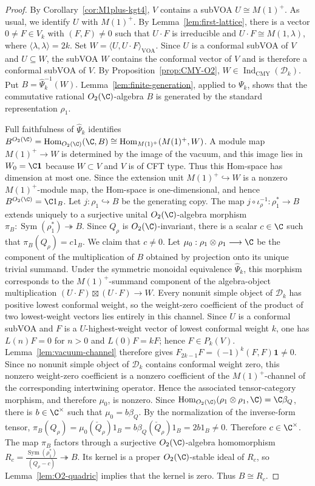 \documentclass[12pt,leqno]{amsart}
\numberwithin{equation}{section} \newtheorem{thm}{Theorem}[section] \newtheorem{lem}[thm]{Lemma} \newtheorem{ex}[thm]{Example} \newtheorem{prop}[thm]{Proposition} \newtheorem{cor}[thm]{Corollary} \newtheorem{defi}[thm]{Definition} \newtheorem{rmk}[thm]{Remark} \newtheorem{notation}[thm]{Notation}
\newcommand{\one}{\mathbf{1}}
\newcommand{\Sym}{\operatorname{Sym}}
\newcommand{\Hom}{\operatorname{Hom}}
\newcommand{\Dk}{\mathcal D_k}
\newcommand{\IndCMY}{\operatorname{Ind}_{\mathrm{CMY}}}
\newcommand{\Otwo}{O_2(\C)}
\begin{document}
\begin{proof}
By Corollary~\ref{cor:M1plus-kgt4}, $V$ contains a subVOA \(U\cong M(1)^+.\) As usual, we identify $U$ with $M(1)^+$. By Lemma~\ref{lem:first-lattice}, there is a vector $0\ne F\in V_k$ with $(F,F)\ne0$ such that $U\cdot F$ is irreducible and \(U\cdot F\cong M(1,\lambda)\), where \(\langle\lambda,\lambda\rangle=2k\). Set \(W=\langle U,U\cdot F\rangle_{\mathrm{VOA}}.\) Since $U$ is a conformal subVOA of $V$ and $U\subseteq W$, the subVOA $W$ contains the conformal vector of $V$ and is therefore a conformal subVOA of $V$. By Proposition~\ref{prop:CMY-O2}, $W\in\IndCMY(\Dk)$. Put \(B=\widehat\Psi_k^{-1}(W).\) Lemma~\ref{lem:finite-generation}, applied to $\Psi_k$, shows that the commutative rational $\Otwo$-algebra $B$ is generated by the standard representation $\rho_1$.

Full faithfulness of $\widehat\Psi_k$ identifies \(B^{\Otwo}=\Hom_{\Otwo}(\C,B)\cong\Hom_{M(1)^+}(M(1)^+,W)\). A module map $M(1)^+\to W$ is determined by the image of the vacuum, and this image lies in $W_0=\C\one$ because $W\subset V$ and $V$ is of CFT type. Thus this Hom-space has dimension at most one. Since the extension unit $M(1)^+\hookrightarrow W$ is a nonzero $M(1)^+$-module map, the Hom-space is one-dimensional, and hence $B^{\Otwo}=\C1_B$. Let $j:\rho_1\hookrightarrow B$ be the generating copy. The map \(j\circ\iota_\rho^{-1}:\rho_1^*\longrightarrow B\) extends uniquely to a surjective unital $\Otwo$-algebra morphism \(\pi_B:\Sym(\rho_1^*)\twoheadrightarrow B\). Since $Q_\rho$ is $\Otwo$-invariant, there is a scalar $c\in\C$ such that \(\pi_B(Q_\rho)=c1_B\). We claim that $c\ne0$. Let \(\mu_0:\rho_1\otimes\rho_1\longrightarrow\C\) be the component of the multiplication of $B$ obtained by projection onto its unique trivial summand. Under the symmetric monoidal equivalence $\widehat\Psi_k$, this morphism corresponds to the $M(1)^+$-summand component of the algebra-object multiplication \((U\cdot F)\boxtimes(U\cdot F)\longrightarrow W\). Every nonunit simple object of $\Dk$ has positive lowest conformal weight, so the weight-zero coefficient of the product of two lowest-weight vectors lies entirely in this channel. Since $U$ is a conformal subVOA and $F$ is a $U$-highest-weight vector of lowest conformal weight $k$, one has $L(n)F=0$ for $n>0$ and $L(0)F=kF$; hence $F\in P_k(V)$. Lemma~\ref{lem:vacuum-channel} therefore gives \(F_{2k-1}F=(-1)^k(F,F)\one\ne0\). Since no nonunit simple object of $\Dk$ contains conformal weight zero, this nonzero weight-zero coefficient is a nonzero coefficient of the $M(1)^+$-channel of the corresponding intertwining operator. Hence the associated tensor-category morphism, and therefore $\mu_0$, is nonzero. Since \(\Hom_{\Otwo}(\rho_1\otimes\rho_1,\C)=\C\beta_Q\), there is $b\in\C^\times$ such that $\mu_0=b\beta_Q$. By the normalization of the inverse-form tensor, \(\pi_B(Q_\rho) =\mu_0(\check Q_\rho)1_B =b\beta_Q(\check Q_\rho)1_B =2b1_B\ne0.\) Therefore $c\in\C^\times$. The map $\pi_B$ factors through a surjective $\Otwo$-algebra homomorphism \(R_c=\frac{\Sym(\rho_1^*)}{(Q_\rho-c)}\twoheadrightarrow B\). Its kernel is a proper $\Otwo$-stable ideal of $R_c$, so Lemma~\ref{lem:O2-quadric} implies that the kernel is zero. Thus \(B\cong R_c.\)


\end{proof}
\end{document}
